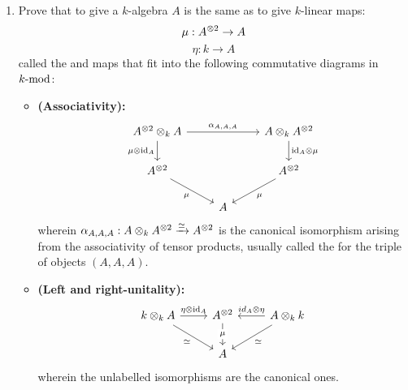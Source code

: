         \begin{question}
            \begin{enumerate}
                \item Prove that to give a $k$-algebra $A$ is the same as to give $k$-linear maps:
                    $$\mu: A^{\tensor 2} \to A$$
                    $$\eta: k \to A$$
                called the  and  maps that fit into the following commutative diagrams in $k\mod$:
                \begin{itemize}
                    \item \textbf{(Associativity):}
                        $$
                            \begin{tikzcd}
                        	{A^{\tensor 2} \tensor_k A} && {A \tensor_k A^{\tensor 2}} \\
                        	{A^{\tensor 2}} && {A^{\tensor 2}} \\
                        	& A
                        	\arrow["{\alpha_{A, A, A}}", from=1-1, to=1-3]
                        	\arrow["{\mu \tensor \id_A}"', from=1-1, to=2-1]
                        	\arrow["{\id_A \tensor \mu}", from=1-3, to=2-3]
                        	\arrow["\mu"', from=2-1, to=3-2]
                        	\arrow["\mu", from=2-3, to=3-2]
                            \end{tikzcd}
                        $$
                    wherein $\alpha_{A, A, A}: A \tensor_k A^{\tensor 2} \xrightarrow[]{\cong} A^{\tensor 2}$ is the canonical isomorphism arising from the associativity of tensor products, usually called the  for the triple of objects $(A, A, A)$. 
                    \item \textbf{(Left and right-unitality):}
                        $$
                            \begin{tikzcd}
                        	{k \tensor_k A} & {A^{\tensor 2}} & {A \tensor_k k} \\
                        	& A
                        	\arrow["{\eta \tensor \id_A}", from=1-1, to=1-2]
                        	\arrow["\cong"', from=1-1, to=2-2]
                        	\arrow["\mu"{description}, from=1-2, to=2-2]
                        	\arrow["{id_A \tensor \eta}"', from=1-3, to=1-2]
                        	\arrow["\cong", from=1-3, to=2-2]
                            \end{tikzcd}
                        $$
                    wherein the unlabelled isomorphisms are the canonical ones. 

\end{itemize}
\end{enumerate}
\end{question}
